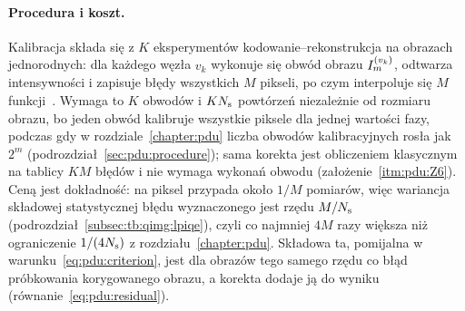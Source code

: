 \paragraph{Procedura i koszt.}\label{par:pdui:procedure}
Kalibracja składa się z $K$ eksperymentów kodowanie--rekonstrukcja na obrazach jednorodnych: dla każdego węzła $v_k$ wykonuje się obwód obrazu $I_m^{(v_k)}$, odtwarza intensywności i zapisuje błędy wszystkich $M$ pikseli, po czym interpoluje się $M$ funkcji~\cite{werner_error_reduction_2025}.
Wymaga to $K$ obwodów i $KN_{\mathrm{s}}$ powtórzeń niezależnie od rozmiaru obrazu, bo jeden obwód kalibruje wszystkie piksele dla jednej wartości fazy, podczas gdy w rozdziale~\ref{chapter:pdu} liczba obwodów kalibracyjnych rosła jak $2^{m}$ (podrozdział~\ref{sec:pdu:procedure}); sama korekta jest obliczeniem klasycznym na tablicy $KM$ błędów i nie wymaga wykonań obwodu (założenie~\ref{itm:pdu:Z6}).
Ceną jest dokładność: na piksel przypada około $1/M$ pomiarów, więc wariancja składowej statystycznej błędu wyznaczonego jest rzędu $M/N_{\mathrm{s}}$ (podrozdział~\ref{subsec:tb:qimg:lpiqe}), czyli co najmniej $4M$ razy większa niż ograniczenie $1/(4N_{\mathrm{s}})$ z rozdziału~\ref{chapter:pdu}.
Składowa ta, pomijalna w warunku~\eqref{eq:pdu:criterion}, jest dla obrazów tego samego rzędu co błąd próbkowania korygowanego obrazu, a korekta dodaje ją do wyniku (równanie~\eqref{eq:pdu:residual}).

